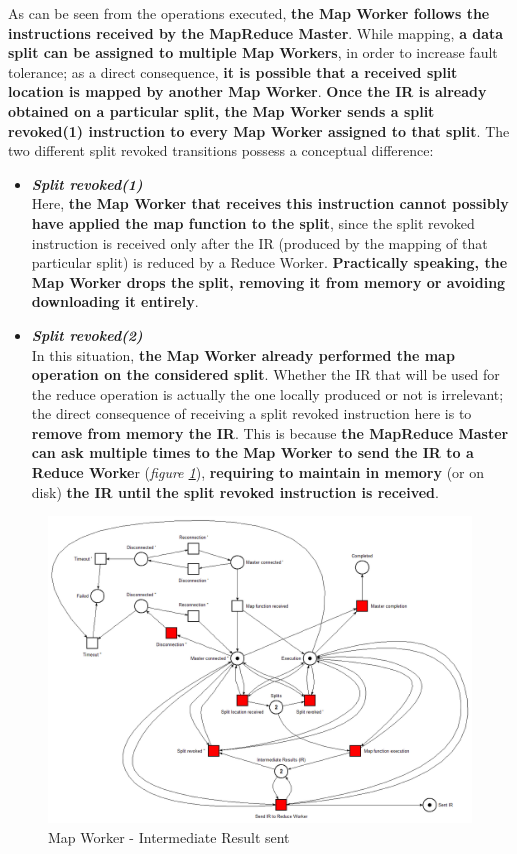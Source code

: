 As can be seen from the operations executed, \textbf{the Map Worker follows the instructions received by the MapReduce Master}. While mapping, \textbf{a data split can be assigned to multiple Map Workers}, in order to increase fault tolerance; as a direct consequence, \textbf{it is possible that a received split location is mapped by another Map Worker}. \textbf{Once the IR is already obtained on a particular split, the Map Worker sends a split revoked(1) instruction to every Map Worker assigned to that split}. The two different split revoked transitions possess a conceptual difference:
\begin{itemize}
    \item \textit{\textbf{Split revoked(1)}}\\
    Here, \textbf{the Map Worker that receives this instruction cannot possibly have applied the map function to the split}, since the split revoked instruction is received only after the IR (produced by the mapping of that particular split) is reduced by a Reduce Worker. \textbf{Practically speaking, the Map Worker drops the split, removing it from memory or avoiding downloading it entirely}.
    \item \textit{\textbf{Split revoked(2)}}\\
    In this situation, \textbf{the Map Worker already performed the map operation on the considered split}. Whether the IR that will be used for the reduce operation is actually the one locally produced or not is irrelevant; the direct consequence of receiving a split revoked instruction here is to \textbf{remove from memory the IR}. This is because \textbf{the MapReduce Master can ask multiple times to the Map Worker to send the IR to a Reduce Worke}r (\textit{figure \ref{fig:map_worker_petri_net_3}}), \textbf{requiring to maintain in memory} (or on disk) \textbf{the IR until the split revoked instruction is received}.
\end{itemize}

\vspace{2mm}

\begin{figure}[!ht]
    \centering
    \includegraphics[width=\linewidth]{document/chapters/chapter_5/images/map_worker_petri_net_3.png}
    \caption{Map Worker - Intermediate Result sent}
    \label{fig:map_worker_petri_net_3}
\end{figure}

